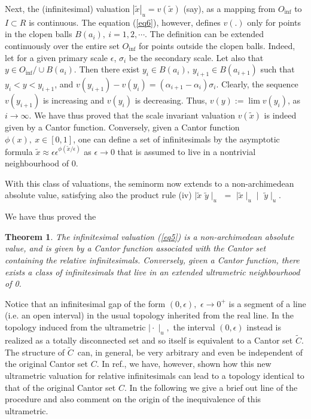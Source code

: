 \documentclass[12pt]{article}
\newtheorem{theorem}{Theorem}
\begin{document}
\vspace{.25cm}

Next, the (infinitesimal) valuation $|\tilde x|_u=v(\tilde x)$ (say), as a mapping from $O_{\inf}$ to $I\subset R$ is continuous. The equation (\ref{eq6}), however, defines $v(.)$ only for points in the clopen balls $B(a_i), \ i=1,2, \cdots$. The definition can be extended continuously over the entire set $O_{\inf}$ for points outside the clopen balls.  
Indeed, let for a given primary scale $\epsilon$, $\sigma_i$ be the secondary scale. Let also that $y\in O_{\inf}/\cup B(a_{i})$. Then there exist $y_i\in B(a_i), \ y_{i+1}\in B(a_{i+1}) $ such that $y_i<y<y_{i+1}$, and $v(y_{i+1})-v(y_i)= (\alpha_{i+1}-\alpha_i) \sigma_i$. Clearly, the sequence $v(y_{i+1})$ is increasing and $v(y_i)$ is decreasing. Thus,  $v(y):=\lim v(y_i)$, as $i\rightarrow \infty$. We have thus proved that the scale invariant valuation $v(\tilde x)$ is indeed given by a Cantor function. Conversely, given a Cantor function $\phi(x), \ x\in [0,1]$, one can define a set of infinitesimals by the asymptotic formula $\tilde x\approx \epsilon\epsilon^{\phi(\tilde x/\epsilon)}$ as $\epsilon\rightarrow 0$ that is assumed to live in a nontrivial neighbourhood of 0.

\vspace{.25cm}

With this class of valuations, the
seminorm now extends to a non-archimedean absolute value, satisfying also the
product rule (iv) $\mid \tilde{x}$ $\tilde{y}\mid_u $ $=$ $\mid \tilde{x}%
\mid _{u}\mid $ $\tilde{y}\mid_u.$

\vspace{.25cm}

We have thus proved the 

\begin{theorem}
The infinitesimal valuation (\ref{eq5}) is a non-archimedean absolute value, and is given by a Cantor function associated with  the Cantor set containing the  relative infinitesimals. Conversely, given a Cantor function, there exists a class of infinitesimals that live in an extended ultrametric neighbourhood of 0.
\end{theorem}

Notice that an infinitesimal gap of the form $(0,\epsilon ),$ $\epsilon
\rightarrow 0^{+}$ is a segment of a line (i.e. an open interval) in the
usual topology inherited from the real line. In the topology induced from
the ultrametric $\mid \cdot \mid _{u},$ the interval $(0,\epsilon )$ instead
is realized as a totally disconnected set and so itself is equivalent to a
Cantor set $\tilde{C}$. The structure of $\tilde{C}$\ can, in general, be
very arbitrary and even be independent of the original Cantor set $C$. In
ref.\cite {sd1, sd2}, we have, however, shown how this new ultrametric
valuation for relative infinitesimals can lead to a topology identical to
that of the original Cantor set $C$. In the following we give a
brief out line of the procedure and also comment on the origin of the
inequivalence of this ultrametric.
\end{document}
